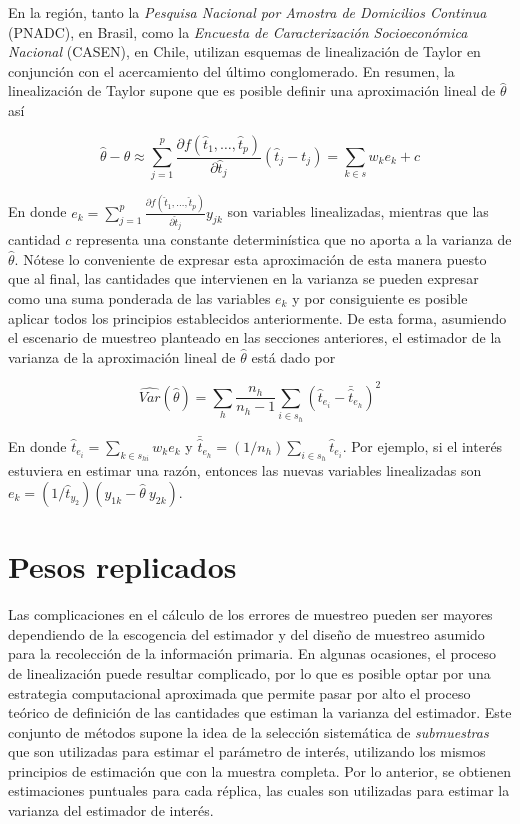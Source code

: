 \documentclass[
  12pt,
]{book}
\begin{document}
En la región, tanto la \emph{Pesquisa Nacional por Amostra de Domicilios Continua} (PNADC), en Brasil, como la \emph{Encuesta de Caracterización Socioeconómica Nacional} (CASEN), en Chile, utilizan esquemas de linealización de Taylor en conjunción con el acercamiento del último conglomerado. En resumen, la linealización de Taylor supone que es posible definir una aproximación lineal de \(\hat{\theta}\) así

\[
\hat{\theta} - \theta 
\approx \sum_{j=1}^p \frac{\partial f(\hat{t}_1, \ldots, \hat{t}_p) }{\partial \hat{t}_j}(\hat{t}_j - t_j)
= \sum_{k\in s} w_k e_k + c
\]

En donde \(e_k= \sum_{j=1}^p \frac{\partial f(\hat{t}_1, \ldots, \hat{t}_p) }{\partial \hat{t}_j} y_{jk}\) son variables linealizadas, mientras que las cantidad \(c\) representa una constante determinística que no aporta a la varianza de \(\hat{\theta}\). Nótese lo conveniente de expresar esta aproximación de esta manera puesto que al final, las cantidades que intervienen en la varianza se pueden expresar como una suma ponderada de las variables \(e_k\) y por consiguiente es posible aplicar todos los principios establecidos anteriormente. De esta forma, asumiendo el escenario de muestreo planteado en las secciones anteriores, el estimador de la varianza de la aproximación lineal de \(\hat{\theta}\) está dado por

\[
\widehat{Var}(\hat{\theta}) = 
\sum_h\frac{n_h}{n_h-1}\sum_{i\in s_h}\left(\hat{t}_{e_i}-\bar{\hat{t}}_{e_h}\right)^2
\]

En donde \(\hat{t}_{e_i} = \sum_{k \in s_{hi}} w_k e_k\) y \(\bar{\hat{t}}_{e_h}=(1/n_h)\sum_{i \in s_h}\hat{t}_{e_i}\). Por ejemplo, si el interés estuviera en estimar una razón, entonces las nuevas variables linealizadas son \(e_k=(1/\hat{t}_{y_2})(y_{1k}-\hat{\theta} \ y_{2k})\).

\hypertarget{pesos-replicados}{%
\section{Pesos replicados}\label{pesos-replicados}}

Las complicaciones en el cálculo de los errores de muestreo pueden ser mayores dependiendo de la escogencia del estimador y del diseño de muestreo asumido para la recolección de la información primaria. En algunas ocasiones, el proceso de linealización puede resultar complicado, por lo que es posible optar por una estrategia computacional aproximada que permite pasar por alto el proceso teórico de definición de las cantidades que estiman la varianza del estimador. Este conjunto de métodos supone la idea de la selección sistemática de \emph{submuestras} que son utilizadas para estimar el parámetro de interés, utilizando los mismos principios de estimación que con la muestra completa. Por lo anterior, se obtienen estimaciones puntuales para cada réplica, las cuales son utilizadas para estimar la varianza del estimador de interés.
\end{document}
